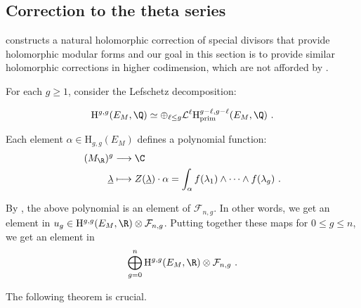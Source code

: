 \documentclass[11pt,letterpaper,english]{amsart}
\numberwithin{equation}{subsection}
\numberwithin{equation}{section}
\newcommand\cF{{\mathcal F}}
\newcommand\cL{{\mathcal L}}
\theoremstyle{plain}
\theoremstyle{remark}
\begin{document}
\subsection{Correction to the theta series}\label{s:corrections-theta-series}

 constructs a natural holomorphic correction of special divisors that provide holomorphic modular forms and our goal in this section is to provide similar holomorphic corrections in higher codimension, which are not afforded by . 

\medskip


For each $g\geq 1$, consider the Lefschetz decomposition:

\[\mathrm{H}^{g,g}(E_M,\Q)\simeq \oplus_{\ell\leq g}\cL^\ell\mathrm{H}_{\mathrm{prim}}^{g-\ell,g-\ell}(E_M,\Q)~.\]



Each element $\alpha\in \mathrm{H}_{g,g}(E_M)$ defines a polynomial function:
\begin{align*}
    (M_\R)^g&\longrightarrow \C\\ 
    \underline\lambda &\longmapsto Z(\underline \lambda)\cdot \alpha=\int_{\alpha}f(\lambda_1)\wedge\cdots\wedge f(\lambda_g)~.
\end{align*}

By , the above polynomial is an element of $\cF_{n,g}$. In other words, we get an element in $u_g\in \mathrm{H}^{g,g}(E_M,\R)\otimes \cF_{n,g}$. Putting together these maps for $0\leq g\leq n$, we get an element in \[\bigoplus_{g=0}^n \mathrm{H}^{g,g}(E_M,\R)\otimes \cF_{n,g}~.\]


The following theorem is crucial.
\end{document}
